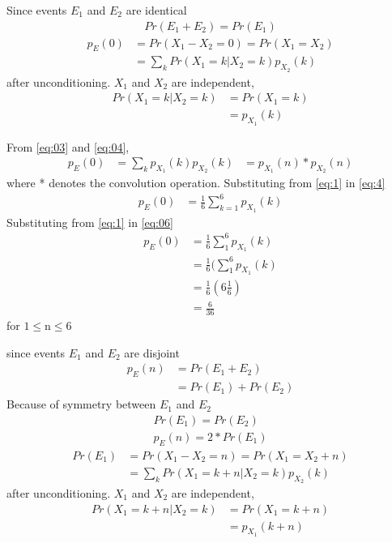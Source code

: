 \documentclass[journal,12pt,twocolumn]{IEEEtran}
\begin{document}
Since events $E_1$ and $E_2$ are identical
\begin{align}
	Pr(E_1+E_2)=Pr(E_1)\nonumber
\end{align} 
\begin{align}
    p_E(0) &= Pr (X_1-X_2 = 0) = Pr (X_1 = X_2 )\nonumber\\
   	&=\sum_{k} Pr(X_1=k|X_2=k)p_{X_{2}}(k)\label{eq:03}
\end{align}
after unconditioning. $X_1$ and $X_2$ are independent,
\begin{align}
	Pr(X_1=k|X_2=k)&=Pr(X_1=k)\nonumber\\
                &=p_{X_{1}}(k)\label{eq:04}
\end{align} 

From \eqref{eq:03} and \eqref{eq:04},
\begin{align}
   p_E(0)  &=\sum_{k}p_{X_{1}}(k)p_{X_{2}}(k)
  &= p_{X_{1}}(n)*p_{X_{2}}(n)\label{eq:05}
\end{align}
where * denotes the convolution operation. Substituting from \eqref{eq:1} in \eqref{eq:4}
\begin{align}
   p_E(0)  &=\frac{1}{6}\sum_{k=1}^{6}p_{X_{1}}(k)\label{eq:06}
\end{align}
Substituting from \eqref{eq:1} in \eqref{eq:06}
\begin{align}
   p_E(0)  &=\frac{1}{6}\sum_{1}^{6}p_{X_{1}}(k)\nonumber\\
  &=\frac{1}{6}(\sum_{1}^{6}p_{X_{1}}(k)\nonumber\\
   &=\frac{1}{6}(6\frac{1}{6})\nonumber\\
    &=\frac{6}{36}\nonumber
\end{align}
for $1\leq  $n$\leq 6$ 

since events $E_1$ and $E_2$ are disjoint
\begin{align}
	p_E(n)&=Pr(E_1+E_2) \nonumber\\
	&=Pr(E_1)+Pr(E_2)\nonumber
\end{align}
Because of symmetry between $E_1$ and $E_2$ 
\begin{align}
	Pr(E_1)=Pr(E_2) \nonumber\\	
	p_E(n)=2*Pr(E_1)\nonumber	
\end{align}
\begin{align}
    Pr(E_1) &= Pr (X_1-X_2 = n) = Pr (X_1 = X_2+n )\nonumber\\
   	&=\sum_{k} Pr(X_1=k+n|X_2=k)p_{X_{2}}(k)\label{eq:3}
\end{align}
after unconditioning. $X_1$ and $X_2$ are independent,
\begin{align}
	Pr(X_1=k+n|X_2=k)&=Pr(X_1=k+n)\nonumber\\
                &=p_{X_{1}}(k+n)\label{eq:4}
\end{align} 
\end{document}
